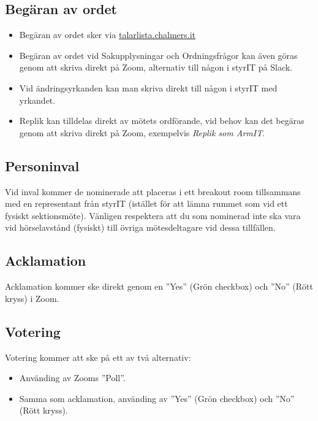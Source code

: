 \documentclass[11pt, noincludeaddress, nopagination]{classes/cthit}
\begin{document}
\subsection*{Begäran av ordet}
\begin{itemize}
    \item Begäran av ordet sker via \href{https://talarlista.chalmers.it/user}{talarlista.chalmers.it}
    \item Begäran av ordet vid Sakupplysningar och Ordningsfrågor kan även göras genom att skriva direkt på Zoom, alternativ till någon i styrIT på Slack.
    \item Vid ändringsyrkanden kan man skriva direkt till någon i styrIT med yrkandet.
    \item Replik kan tilldelas direkt av mötets ordförande, vid behov kan det begäras genom att skriva direkt på Zoom, exempelvis \textit{Replik som ArmIT}.
\end{itemize}

\subsection*{Personinval}
Vid inval kommer de nominerade att placeras i ett breakout room tillsammans med en representant från styrIT (istället för att lämna rummet som vid ett fysiskt sektionsmöte). Vänligen respektera att du som nominerad inte ska vara vid hörselavstånd (fysiskt) till övriga mötesdeltagare vid dessa tillfällen.

\subsection*{Acklamation}
Acklamation kommer ske direkt genom en ''Yes'' (Grön checkbox) och ''No'' (Rött kryss) i Zoom.

\subsection*{Votering}

Votering kommer att ske på ett av två alternativ:

\begin{itemize}
    \item Använding av Zooms ''Poll''. 
    \item Samma som acklamation, använding av ''Yes'' (Grön checkbox) och ''No'' (Rött kryss).
\end{itemize}
\end{document}
